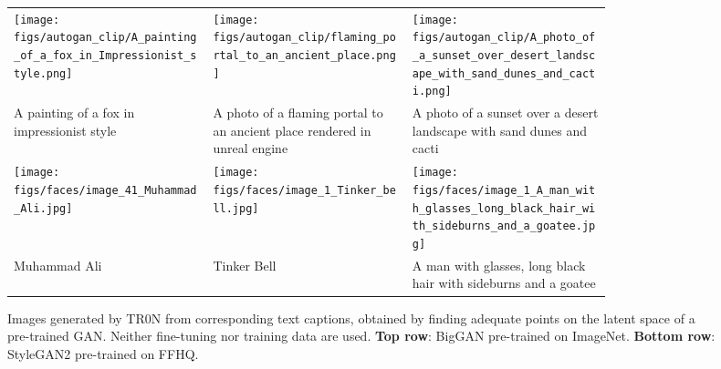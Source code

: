 \documentclass[nohyperref]{article}
\theoremstyle{plain}
\theoremstyle{definition}
\theoremstyle{remark}
\begin{document}
\begin{figure} [t!]
\centering
\fontsize{7.5}{9}
\selectfont
\begin{tabular}
{p{0.28\linewidth}p{0.28\linewidth}p{0.28\linewidth}}
   \texttt{[image: figs/autogan\_clip/A\_painting\_of\_a\_fox\_in\_Impressionist\_style.png]} & \texttt{[image: figs/autogan\_clip/flaming\_portal\_to\_an\_ancient\_place.png]}
   & \texttt{[image: figs/autogan\_clip/A\_photo\_of\_a\_sunset\_over\_desert\_landscape\_with\_sand\_dunes\_and\_cacti.png]}\\
    A painting of a fox in impressionist style & A photo of a flaming portal to an ancient place rendered in unreal engine &   A photo of a sunset over a desert landscape with sand dunes and cacti\\
   \texttt{[image: figs/faces/image\_41\_Muhammad\_Ali.jpg]} & 
   \texttt{[image: figs/faces/image\_1\_Tinker\_bell.jpg]}
   &\texttt{[image: figs/faces/image\_1\_A\_man\_with\_glasses\_long\_black\_hair\_with\_sideburns\_and\_a\_goatee.jpg]}\\
  \hspace{3ex}Muhammad Ali &   \hspace{5ex}Tinker Bell & A man with glasses, long black hair with sideburns and a goatee
\end{tabular}
\vspace{-10pt}
\caption{Images generated by TR0N from corresponding text captions, obtained by finding adequate points on the latent space of a pre-trained GAN. Neither fine-tuning nor training data are used. \textbf{Top row}: BigGAN pre-trained on ImageNet. \textbf{Bottom row}: StyleGAN2 pre-trained on FFHQ.}
\label{fig:fig1}
\vspace{-10pt}
\end{figure} 
\end{document}
